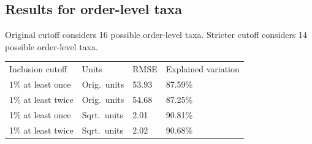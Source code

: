 \documentclass{article}
\begin{document}
\subsection{Results for order-level taxa}

Original cutoff considers 16 possible order-level taxa.
Stricter cutoff considers 14 possible order-level taxa.

\begin{tabular}{llll}
Inclusion cutoff & Units  & RMSE & Explained variation\\
1\% at least once  & Orig.~units & 53.93 & 87.59\%\\
1\% at least twice & Orig.~units & 54.68 & 87.25\%\\
1\% at least once  & Sqrt.~units & 2.01 & 90.81\%\\
1\% at least twice & Sqrt.~units & 2.02 & 90.68\%
\end{tabular}
\end{document}
